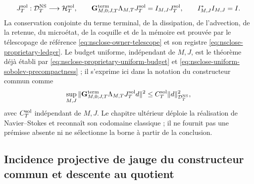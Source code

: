 \begin{equation}\label{eq:pdf2-g-sol-raiz-dato}
 J_T^{\rm sol}:\mathcal D_T^{\rm NS}\longrightarrow\mathcal H_T^{\rm sol},
 \qquad
 \mathbf G_{M,0;J,T}^{\rm term}\Lambda_{M,T}J_T^{\rm sol}
 =I_{M,J}J_T^{\rm sol},
 \qquad I_{M,J}^*I_{M,J}=I.
\end{equation}
La conservation conjointe du terme terminal, de la dissipation, de l’advection, de la retenue, du microétat, de la coquille et de la mémoire est prouvée par le télescopage de référence \eqref{eq:nsclose-owner-telescope} et son registre \eqref{eq:nsclose-proprietary-ledger}. Le budget uniforme, indépendant de $M,J$, est le théorème déjà établi par \eqref{eq:nsclose-proprietary-uniform-budget} et \eqref{eq:nsclose-uniform-sobolev-precompactness} ; il s’exprime ici dans la notation du constructeur commun comme
\begin{equation}\label{eq:pdf2-g-sol-cota-dato}
 \sup_{M,J}
 \|\mathbf G_{M,0;J,T}^{\rm term}\Lambda_{M,T}J_T^{\rm sol}d\|^2
 \le C_T^{\rm sol}\|d\|_{\mathcal D_T^{\rm NS}}^2,
\end{equation}
avec $C_T^{\rm sol}$ indépendant de $M,J$. Le chapitre ultérieur déploie la réalisation de Navier--Stokes et reconnaît son codomaine classique ; il ne fournit pas une prémisse absente ni ne sélectionne la borne à partir de la conclusion.

\subsection{Incidence projective de jauge du constructeur commun et descente au quotient}

